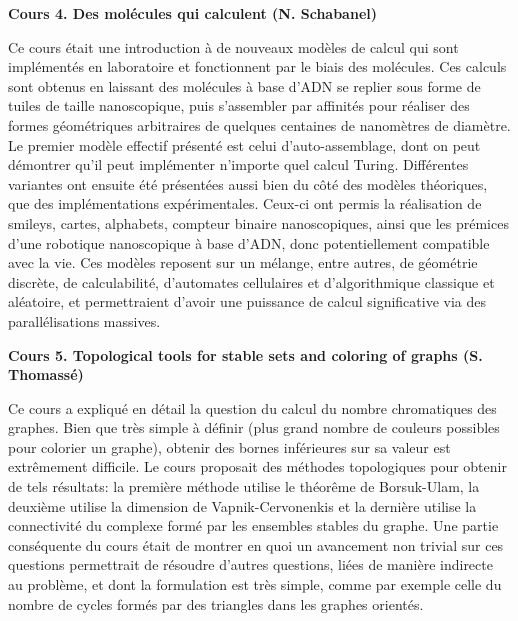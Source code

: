 \documentclass[a4paper, 11pt]{article}
\begin{document}
 

\begin{center} \textbf{Cours 4. Des molécules qui calculent (N. Schabanel)} \end{center}

Ce cours était une introduction à de nouveaux modèles de calcul qui sont implémentés en laboratoire et fonctionnent par le biais des molécules. Ces calculs sont obtenus en laissant des molécules à base d’ADN se replier sous forme de tuiles de taille nanoscopique, puis s’assembler par affinités pour réaliser des formes géométriques arbitraires de quelques centaines de nanomètres de diamètre. Le premier modèle effectif présenté est celui d’auto-assemblage, dont on peut démontrer qu’il peut implémenter n’importe quel calcul Turing. Différentes variantes ont ensuite été présentées aussi bien du côté des modèles théoriques, que des implémentations expérimentales. Ceux-ci ont permis la réalisation de smileys, cartes, alphabets, compteur binaire nanoscopiques, ainsi que les prémices d’une robotique nanoscopique à base d’ADN, donc potentiellement compatible avec la vie. Ces modèles reposent sur un mélange, entre autres, de géométrie discrète, de calculabilité, d’automates cellulaires et d’algorithmique classique et aléatoire, et permettraient d'avoir une puissance de calcul significative via des parallélisations massives.

\begin{center} \textbf{Cours 5. Topological tools for stable sets and coloring of graphs (S. Thomassé)} \end{center}

Ce cours a expliqué en détail la question du calcul du nombre chromatiques des graphes. Bien que très simple à définir (plus grand nombre de couleurs possibles pour colorier un graphe), obtenir des bornes inférieures sur sa valeur est extrêmement difficile. Le cours proposait des méthodes topologiques pour obtenir de tels résultats: la première méthode utilise le théorême de Borsuk-Ulam, la deuxième utilise la dimension de Vapnik-Cervonenkis et la dernière utilise la connectivité du complexe formé par les ensembles stables du graphe. Une partie conséquente du cours était de montrer en quoi un avancement non trivial sur ces questions permettrait de résoudre d'autres questions, liées de manière indirecte au problème, et dont la formulation est très simple, comme par exemple celle du nombre de cycles formés par des triangles dans les graphes orientés.
\end{document}
